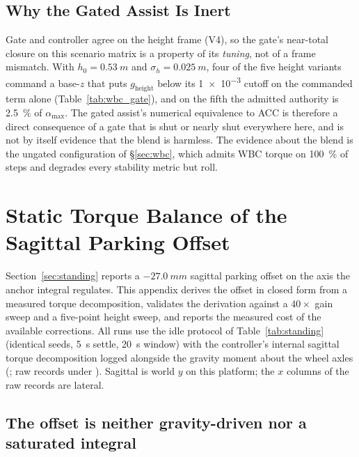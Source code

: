 \documentclass[conference]{IEEEtran}
\begin{document}
\subsection{Why the Gated Assist Is Inert}

Gate and controller agree on the height frame (V4), so the gate's near-total
closure on this scenario matrix is a property of its \emph{tuning}, not of a
frame mismatch. With $h_0{=}\SI{0.53}{m}$ and $\sigma_h{=}\SI{0.025}{m}$, four of
the five height variants command a base-$z$ that puts $g_{\text{height}}$ below
its \num{1e-3} cutoff on the commanded term alone (Table~\ref{tab:wbc_gate}), and
on the fifth the admitted authority is \SI{2.5}{\percent} of $\alpha_{\max}$.
The gated assist's numerical equivalence to ACC is therefore a direct
consequence of a gate that is shut or nearly shut everywhere here, and is not by
itself evidence that the blend is harmless. The evidence about the blend is the
ungated configuration of \S\ref{sec:wbc}, which admits WBC torque on
\SI{100}{\percent} of steps and degrades every stability metric but roll.

\section{Static Torque Balance of the Sagittal Parking Offset}
\label{sec:parking_supp}

Section~\ref{sec:standing} reports a $\SI{-27.0}{mm}$ sagittal parking offset on the axis the
anchor integral regulates. This appendix derives the offset in closed form from a measured torque
decomposition, validates the derivation against a $40{\times}$ gain sweep and
a five-point height sweep, and reports the measured cost of the available
corrections.
All runs use the idle protocol of Table~\ref{tab:standing} (identical seeds,
\SI{5}{s} settle, \SI{20}{s} window) with the controller's internal sagittal
torque decomposition logged alongside the gravity moment about the wheel axles
(; raw records under
). Sagittal is world $y$ on this
platform; the $x$ columns of the raw records are lateral.

\subsection{The offset is neither gravity-driven nor a saturated integral}
\end{document}
